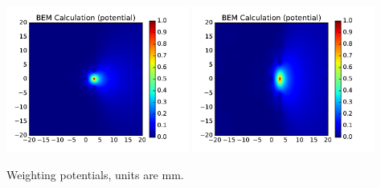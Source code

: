 \documentclass[xcolor=dvipsnames]{beamer}
\begin{document}
\begin{frame}
  \includegraphics[width=6cm]{parallel-near-d11.pdf}%
  \includegraphics[width=6cm]{uboone-near-d11.pdf}

  \vspace{-3mm}
  \begin{center}\scriptsize
    Weighting potentials, units are mm.
  \end{center}

\end{frame}
\end{document}
